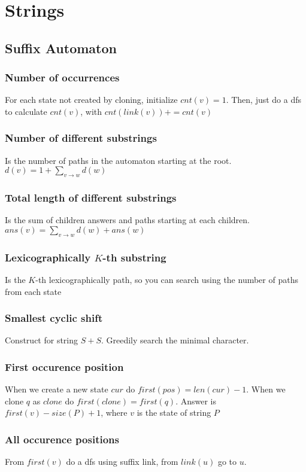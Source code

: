 \chapter{Strings}

\section{Suffix Automaton}
\subsection{Number of occurrences}
        For each state not created by cloning, initialize $cnt(v) = 1$. 
        Then, just do a dfs to calculate $cnt(v)$, with $cnt(link(v)) += cnt(v)$

\subsection{Number of different substrings}
        Is the number of paths in the automaton starting at the root.
        $d(v) = 1 + \sum_{v \rightarrow w} d(w)$

\subsection{Total length of different substrings}
        Is the sum of children answers and paths starting 
        at each children.
        $ans(v) = \sum_{v \rightarrow w} d(w) + ans(w)$


\subsection{Lexicographically $K$-th substring}
        Is the $K$-th lexicographically path, so you can search using the number of paths from each state

\subsection{Smallest cyclic shift}
        Construct for string $S + S$. Greedily search 
        the minimal character.

\subsection{First occurence position}
        When we create a new state $cur$ do $first(pos) = len(cur) - 1$.
        When we clone $q$ as $clone$ do $first(clone) = first(q)$.
        Answer is $first(v) - size(P) + 1$, where $v$ is the state of string $P$

\subsection{All occurence positions}
        From $first(v)$ do a dfs using suffix link, from $link(u)$ go to $u$.

